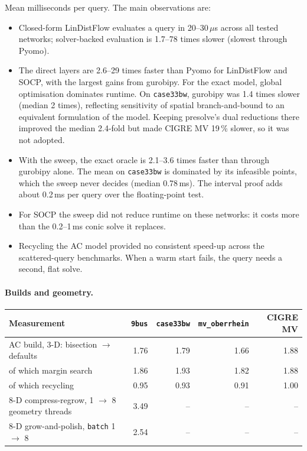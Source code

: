 \documentclass[11pt,a4paper]{report}
\newcommand{\code}[1]{\texttt{\small #1}}
\begin{document}
\noindent Mean milliseconds per query. The main observations are:
\begin{itemize}[itemsep=0.1em]
\item Closed-form LinDistFlow evaluates a query in 20--30\,$\mu$s across all
  tested networks; solver-backed evaluation is 1.7--78 times slower (slowest
  through Pyomo).
\item The direct layers are 2.6--29 times faster than Pyomo for LinDistFlow and
  SOCP, with the largest gains from gurobipy. For the exact model, global
  optimisation dominates runtime. On \code{case33bw},
  gurobipy was 1.4 times slower (median 2 times), reflecting sensitivity of
  spatial branch-and-bound to an equivalent formulation of the
  model. Keeping presolve's dual reductions there improved the median 2.4-fold
  but made CIGRE MV 19\,\% slower, so it was not adopted.
\item With the sweep, the exact oracle is 2.1--3.6 times faster than through
  gurobipy alone. The mean on
  \code{case33bw} is dominated by its infeasible points, which the sweep never
  decides (median 0.78\,ms). The interval proof adds about 0.2\,ms per query
  over the floating-point test.
\item For SOCP the sweep did not reduce runtime on these networks: it costs
  more than the 0.2--1\,ms conic solve it replaces.
\item Recycling the AC model provided no consistent speed-up across the
  scattered-query benchmarks. When a warm
  start fails, the query needs a second, flat solve.
\end{itemize}

\paragraph{Builds and geometry.}
\begin{center}\footnotesize
\begin{tabular}{@{}lrrrr@{}}
\toprule
Measurement & \code{9bus} & \code{case33bw} & \code{mv\_oberrhein} & CIGRE MV \\
\midrule
AC build, 3-D: bisection $\to$ defaults           & 1.76 & 1.79 & 1.66 & 1.88 \\
\quad of which margin search                      & 1.86 & 1.93 & 1.82 & 1.88 \\
\quad of which recycling                          & 0.95 & 0.93 & 0.91 & 1.00 \\
8-D compress-regrow, 1 $\to$ 8 geometry threads   & 3.49 & --   & --   & --   \\
8-D grow-and-polish, \code{batch} 1 $\to$ 8       & 2.54 & --   & --   & --   \\
\bottomrule
\end{tabular}
\end{center}
\end{document}
